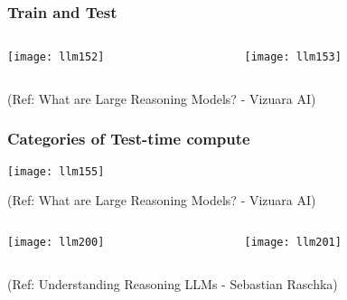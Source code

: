 \begin{frame}[fragile]\frametitle{Train and Test}


\begin{columns}
    \begin{column}[T]{0.5\linewidth}
		\begin{center}
		\texttt{[image: llm152]}
		\end{center}

    \end{column}
    \begin{column}[T]{0.5\linewidth}
		\begin{center}
		\texttt{[image: llm153]}
		\end{center}
    \end{column}
  \end{columns}


{\tiny (Ref: What are Large Reasoning Models? - Vizuara AI)}

\end{frame}

\begin{frame}[fragile]\frametitle{Categories of Test-time compute}

  
  		\begin{center}
		\texttt{[image: llm155]}
		
		{\tiny (Ref: What are Large Reasoning Models? - Vizuara AI)}

		\end{center}
		
\begin{columns}
    \begin{column}[T]{0.5\linewidth}
		\begin{center}
		\texttt{[image: llm200]}
		\end{center}

    \end{column}
    \begin{column}[T]{0.5\linewidth}
		\begin{center}
		\texttt{[image: llm201]}
		\end{center}
    \end{column}
  \end{columns}

{\tiny (Ref: Understanding Reasoning LLMs - Sebastian Raschka)}

\end{frame}


